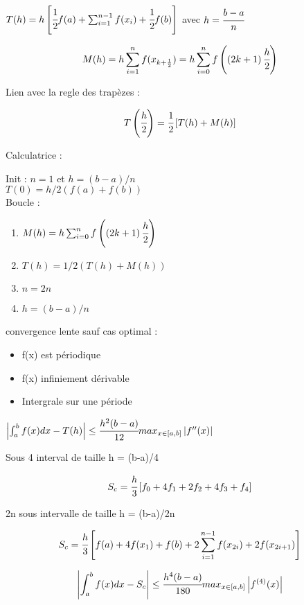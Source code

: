 
{\hspace{-1cm}
$T(h) = h\left[ \cfrac{1}{2} f(a) + \sum_{i=1}^{n-1} f(x_i) + \cfrac{1}{2} f(b) \right]$ avec $h = \cfrac{b-a}{n}$
}

$$M(h) = h \sum_{i=1}^{n} f(x_{k+\frac{1}{2}}) =  h \sum_{i=0}^{n} f\left(\left(2k+1\right)\cfrac{h}{2}\right)$$

Lien avec la regle des trapèzes : 

$$T\left(\cfrac{h}{2}\right) = \cfrac{1}{2} \left[T(h) + M(h)\right]$$

Calculatrice : 

Init  : $n = 1$ et $h = (b-a)/n$ \\
$T(0) = h/2 (f(a) + f(b))$\\

Boucle : 
\begin{enumerate}
    \item $M(h) = h \sum_{i=0}^{n} f\left(\left(2k+1\right)\cfrac{h}{2}\right) $
    \item $T(h) = 1/2 (T(h) + M(h))$
    \item $n = 2n$
    \item $h = (b-a)/n$
\end{enumerate}

\newpage 

convergence lente sauf cas optimal :
\begin{itemize}
    \item f(x) est périodique
    \item f(x) infiniement dérivable
    \item Intergrale sur une période
\end{itemize}

$\left\lvert \int_{a}^{b} f(x) dx - T(h) \right\rvert \leq \cfrac{h^2 (b-a)}{12} max_{x \in [a,b]} \left\lvert f''(x) \right\rvert$


Sous 4 interval de taille h = (b-a)/4

$$S_c = \cfrac{h}{3} \left[ f_0 + 4f_1 + 2f_2 + 4f_3 + f_4 \right]$$

2n sous intervalle de taille h = (b-a)/2n

$$S_c = \cfrac{h}{3} \left[ f(a)+4f(x_1) + f(b) + 2 \sum_{i=1}^{n-1} f(x_{2i}) + 2f(x_{2i+1}) \right]$$ 


$$\left\lvert \int_{a}^{b} f(x) dx - S_c \right\rvert \leq \cfrac{h^4 (b-a)}{180} max_{x \in [a,b]} \left\lvert f^{(4)}(x) \right\rvert$$




